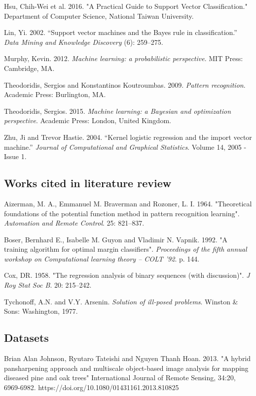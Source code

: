 \documentclass[letterpaper, 11pt]{article}
\begin{document}
Hsu, Chih-Wei et al. 2016. "A Practical Guide to Support Vector Classification." Department of Computer Science, National Taiwan University.

Lin, Yi. 2002. ``Support vector machines and the Bayes rule in classification.'' \emph{Data Mining and Knowledge Discovery} (6): 259–275.

Murphy, Kevin. 2012. \emph{Machine learning: a probabilistic perspective}. MIT Press: Cambridge, MA.

Theodoridis, Sergios and Konstantinos Koutroumbas. 2009. \emph{Pattern recognition}. Academic Press: Burlington, MA.

Theodoridis, Sergios. 2015. \emph{Machine learning: a Bayesian and optimization perspective}. Academic Press: London, United Kingdom.

Zhu, Ji and Trevor Hastie. 2004. ``Kernel logistic regression and the import vector machine.'' \emph{Journal of Computational and Graphical Statistics}.  
Volume 14, 2005 - Issue 1.

\subsection{Works cited in literature review}

Aizerman, M. A., Emmanuel M. Braverman and Rozoner, L. I. 1964. "Theoretical foundations of the potential function method in pattern recognition learning". \emph{Automation and Remote Control}. 25: 821–837.

Boser, Bernhard E., Isabelle M. Guyon and Vladimir N. Vapnik. 1992. "A training algorithm for optimal margin classifiers". \emph{Proceedings of the fifth annual workshop on Computational learning theory – COLT '92}. p. 144.

Cox, DR. 1958. "The regression analysis of binary sequences (with discussion)". \emph{J Roy Stat Soc B}. 20: 215–242.

Tychonoff, A.N. and V.Y. Arsenin. \emph{Solution of ill-posed problems}. Winston \& Sons: Washington, 1977.

\subsection{Datasets}

Brian Alan Johnson, Ryutaro Tateishi and Nguyen Thanh Hoan. 2013. "A hybrid pansharpening approach and multiscale object-based image analysis for mapping diseased pine and oak trees" International Journal of Remote Sensing, 34:20, 6969-6982. https://doi.org/10.1080/01431161.2013.810825
\end{document}
